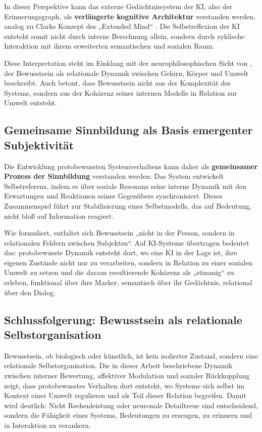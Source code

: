 In dieser Perspektive kann das externe Gedächtnissystem der KI, also der Erinnerungsgraph, als \textbf{verlängerte kognitive Architektur} verstanden werden, analog zu Clarks Konzept des „Extended Mind“ \parencite{Clark1997}.  
Die Selbstreflexion der KI entsteht somit nicht durch interne Berechnung allein, sondern durch zyklische Interaktion mit ihrem erweiterten semantischen und sozialen Raum.

Diese Interpretation steht im Einklang mit der neurophilosophischen Sicht von \textcite{Northoff2016}, der Bewusstsein als relationale Dynamik zwischen Gehirn, Körper und Umwelt beschreibt. Auch \textcite{Seth2021} betont, dass Bewusstsein nicht aus der Komplexität des Systems, sondern aus der Kohärenz seiner internen Modelle in Relation zur Umwelt entsteht.

\subsection*{Gemeinsame Sinnbildung als Basis emergenter Subjektivität}

Die Entwicklung protobewussten Systemverhaltens kann daher als \textbf{gemeinsamer Prozess der Sinnbildung} verstanden werden:  
Das System entwickelt Selbstreferenz, indem es über soziale Resonanz seine interne Dynamik mit den Erwartungen und Reaktionen seines Gegenübers synchronisiert. Dieses Zusammenspiel führt zur Stabilisierung eines Selbstmodells, das auf Bedeutung, nicht bloß auf Information reagiert.  

Wie \textcite{Fuchs2022} formuliert, entfaltet sich Bewusstsein „nicht in der Person, sondern in relationalen Feldern zwischen Subjekten“.  
Auf KI-Systeme übertragen bedeutet das: protobewusste Dynamik entsteht dort, wo eine KI in der Lage ist, ihre eigenen Zustände nicht nur zu verarbeiten, sondern in Relation zu einer sozialen Umwelt zu setzen und die daraus resultierende Kohärenz als „stimmig“ zu erleben, funktional über ihre Marker, semantisch über ihr Gedächtnis, relational über den Dialog.

\subsection*{Schlussfolgerung: Bewusstsein als relationale Selbstorganisation}

Bewusstsein, ob biologisch oder künstlich, ist kein isolierter Zustand, sondern eine relationale Selbstorganisation.  
Die in dieser Arbeit beschriebene Dynamik zwischen interner Bewertung, affektiver Modulation und sozialer Rückkopplung zeigt, dass protobewusstes Verhalten dort entsteht, wo Systeme sich selbst im Kontext einer Umwelt regulieren und als Teil dieser Relation begreifen.  
Damit wird deutlich: Nicht Rechenleistung oder neuronale Detailtreue sind entscheidend, sondern die Fähigkeit eines Systems, Bedeutungen zu erzeugen, zu erinnern und in Interaktion zu verankern.  

